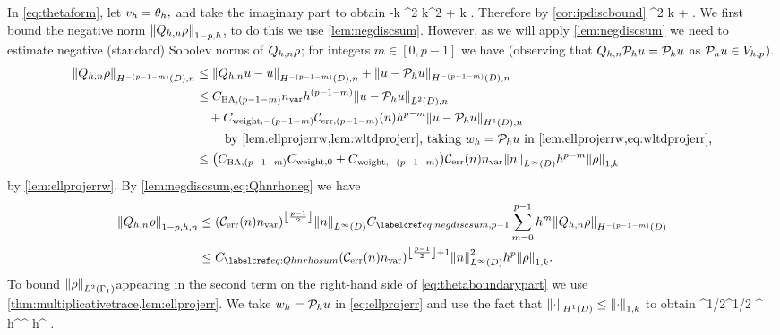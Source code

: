 In \cref{eq:thetaform}, let $v_{h} = \theta_{h},$ and take the imaginary part to obtain
\beq\label{eq:boundboundarybelow}
-k \NLtGI{\thetah}^2 \leq \Im k^2 \IPLtDn{\Qhn \rho}{\thetah} + \Re k \IPLtGI{\rho}{\thetah}.
\eeq
Therefore by \cref{cor:ipdiscbound}
\beq
\NLtGI{\thetah}^2 \leq  k  + \NLtGI{\rho}\NLtGI{\thetah}.\label{eq:thetaboundarypart}
\eeq
We first bound the negative norm $\Nfn{1-p,h}{\Qhn\rho}$, to do this we use \cref{lem:negdiscsum}. However, as we will apply \cref{lem:negdiscsum} we need to estimate negative (standard) Sobolev norms of $Q_{h,n}\rho$; for integers $m \in [0,p-1]$ we have (observing that $Q_{h,n} \mathcal P_{h} u = \mathcal P_{h} u$ as $\mathcal P_{h} u \in V_{h,p}$).
\begin{align}
\NHnfn{-(p-1-m)}{D}{\Qhn\rho} &\leq \NHnfn{-(p-1-m)}{D}{\Qhn u - u} + \NHnfn{-(p-1-m)}{D}{u - \Ph u}\nonumber\\
&\leq \CSZfn{(p-1-m)} \nvar h^{(p-1-m)} \NLtDn{u-\Ph u}\nonumber\\
&\quad+ \Cwfn{-(p-1-m)}\errn{(p-1-m)} h^{p-m} \NHoDn{u - \Ph u}\nonumber\\
&\quad\quad\text{ by \cref{lem:ellprojerrw,lem:wltdprojerr}, taking } \wh = \Ph u \text{ in \cref{lem:ellprojerrw,eq:wltdprojerr},}\nonumber\\
&\leq \mleft(\CSZfn{(p-1-m)} \Cwz + \Cwfn{-(p-1-m)}\mright)\En\nvar\NLiD{n} h^{p-m} \NW{\rho}\label{eq:Qhnrhoneg}
\end{align}
by \cref{lem:ellprojerrw}. By \cref{lem:negdiscsum,eq:Qhnrhoneg} we have
\begin{align}
\Nfn{1-p,h,n}{\Qhn \rho}&\leq \mleft(\En\nvar\mright)^{\floor{\frac{p-1}2}}\NLiD{n} \Csumfn{p-1} \sum_{m=0}^{p-1} h^{m} \NHfn{-(p-1-m)}{D}{\Qhn \rho} \nonumber\\
&\leq \Cmess \mleft(\En\nvar\mright)^{\floor{\frac{p-1}2}+1}\NLiD{n}^2 h^p \NW{\rho}.\label{eq:Qhnrhosum}
\end{align}
To bound $\NLtGI{\rho}$appearing in  the second term on the right-hand side of \cref{eq:thetaboundarypart} we use \cref{thm:multiplicativetrace,lem:ellprojerr}. We take $w_{h} = \mathcal P_{h} u$ in \cref{eq:ellprojerr} and use the fact that $\NHoD{\cdot} \leq \NW{\cdot}$ to obtain
\beq\label{eq:rhomtbound}
\NLtGI{\rho} \leq \CMT\NHoD{\rho}^{1/2}\NLtD{\rho}^{1/2} \leq \CMT {}^{\half} h^\half \NHoD{\rho}\leq \CMT {}^{\half} h^{\half} \NW{\rho}.
